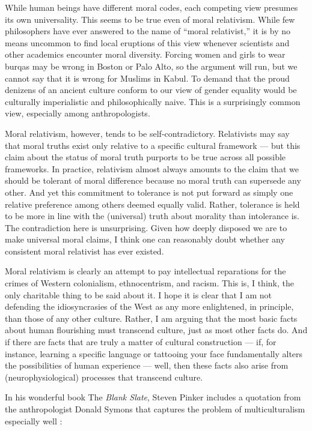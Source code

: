 \documentclass[a4paper,14pt]{extbook}
\begin{document}
While human beings have different moral codes, each competing view presumes its own universality.
This seems to be true even of moral relativism.
While few philosophers have ever answered to the name of ``moral relativist,'' it is by no means uncommon to find local eruptions of this view whenever scientists and other academics encounter moral diversity.
Forcing women and girls to wear burqas may be wrong in Boston or Palo Alto, so the argument will run, but we cannot say that it is wrong for Muslims in Kabul.
To demand that the proud denizens of an ancient culture conform to our view of gender equality would be culturally imperialistic and philosophically naive.
This is a surprisingly common view, especially among anthropologists.

Moral relativism, however, tends to be self-contradictory.
Relativists may say that moral truths exist only relative to a specific cultural framework --- but this claim about the status of moral truth purports to be true across all possible frameworks.
In practice, relativism almost always amounts to the claim that we should be tolerant of moral difference because no moral truth can supersede any other.
And yet this commitment to tolerance is not put forward as simply one relative preference among others deemed equally valid.
Rather, tolerance is held to be more in line with the (universal) truth about morality than intolerance is.
The contradiction here is unsurprising.
Given how deeply disposed we are to make universal moral claims, I think one can reasonably doubt whether any consistent moral relativist has ever existed.

Moral relativism is clearly an attempt to pay intellectual reparations for the crimes of Western colonialism, ethnocentrism, and racism.
This is, I think, the only charitable thing to be said about it.
I hope it is clear that I am not defending the idiosyncrasies of the West as any more enlightened, in principle, than those of any other culture.
Rather, I am arguing that the most basic facts about human flourishing must transcend culture, just as most other facts do.
And if there are facts that are truly a matter of cultural construction --- if, for instance, learning a specific language or tattooing your face fundamentally alters the possibilities of human experience --- well, then these facts also arise from (neurophysiological) processes that transcend culture.

In his wonderful book The \textit{Blank Slate}, Steven Pinker includes a quotation from the anthropologist Donald Symons that captures the problem of multiculturalism especially well :
\end{document}

